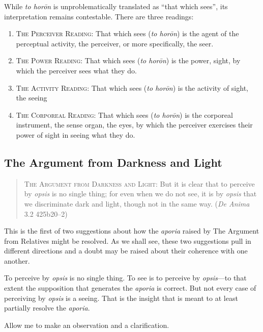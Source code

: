 While \emph{to horōn} is unproblematically translated as ``that which sees'', its interpretation remains contestable. There are three readings:
\begin{enumerate}[(1)]
	\item \textsc{The Perceiver Reading}: That which sees (\emph{to horōn}) is the agent of the perceptual activity, the perceiver, or more specifically, the seer.
	\item \textsc{The Power Reading}: That which sees (\emph{to horōn}) is the power, sight, by which the perceiver sees what they do.
	\item \textsc{The Activity Reading}: That which sees (\emph{to horōn}) is the activity of sight, the seeing
	\item \textsc{The Corporeal Reading}: That which sees (\emph{to horōn}) is the corporeal instrument, the sense organ, the eyes, by which the perceiver exercises their power of sight in seeing what they do.
\end{enumerate}


\subsection{The Argument from Darkness and Light} %
\label{sub:the_argument_from_darkness}

\begin{quote}
	\textsc{The Argument from Darkness and Light}: But it is clear that to perceive by \emph{opsis} is no single thing; for even when we do not see, it is by \emph{opsis} that we discriminate dark and light, though not in the same way. (\emph{De Anima} 3.2 425b20–2)
\end{quote}

This is the first of two suggestions about how the \emph{aporia} raised by The Argument from Relatives might be resolved. As we shall see, these two suggestions pull in different directions and a doubt may be raised about their coherence with one another.

To perceive by \emph{opsis} is no single thing. To see is to perceive by \emph{opsis}—to that extent the supposition that generates the \emph{aporia} is correct. But not every case of perceiving by \emph{opsis} is a seeing. That is the insight that is meant to at least partially resolve the \emph{aporia}.

Allow me to make an observation and a clarification.

